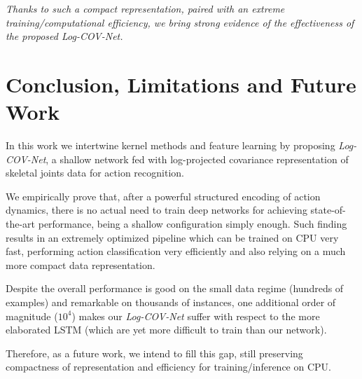 \documentclass[10pt,twocolumn]{article}
\begin{document}
\emph{Thanks to such a compact representation, paired with an extreme training/computational efficiency, we bring strong evidence of the effectiveness of the proposed \textit{Log-COV-Net}.}




\section{Conclusion, Limitations and Future Work}\label{sez:ciao}

In this work we intertwine kernel methods and feature learning by proposing \textit{Log-COV-Net}, a shallow network fed with log-projected covariance representation of skeletal joints data for action recognition. 

We empirically prove that, after a powerful structured encoding of action dynamics, there is no actual need to train deep networks for achieving state-of-the-art performance, being a shallow configuration simply enough. Such finding results in an extremely optimized pipeline which can be trained on CPU very fast, performing action classification very efficiently and also relying on a much more compact data representation. 

Despite the overall performance is good on the small data regime (hundreds of examples) and remarkable on thousands of instances, one additional order of magnitude  ($10^4$) makes our \textit{Log-COV-Net} suffer with respect to the more elaborated LSTM (which are yet more difficult to train than our network).

Therefore, as a future work, we intend to fill this gap, still preserving compactness of representation and efficiency for training/inference on CPU.

{\small
	
	
}
	
\end{document}
